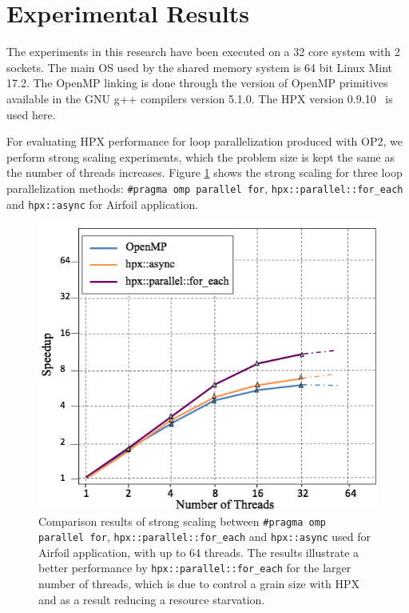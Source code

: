 \documentclass[conference]{IEEEtran}
\begin{document}
\section{Experimental Results}
\label{sec:res}


The experiments in this research have been executed on a 32 core system with 2 sockets. The main OS used by the shared memory system is 64 bit Linux Mint 17.2. The OpenMP linking is done through the version of OpenMP primitives available in the GNU g++ compilers version 5.1.0. The HPX version 0.9.10~\cite{hpx_v0.9.11} is used here.
 
 

For evaluating HPX performance for loop parallelization produced with OP2, we perform strong scaling experiments, which the problem size is kept the same as the number of threads increases. Figure \ref{f1} shows the strong scaling for three loop parallelization methods: \texttt{\#pragma omp parallel for}, \texttt{hpx::parallel::for\_each} and \texttt{hpx::async} for Airfoil application.

\begin{figure} [!h]
\begin{center}
\centering
\includegraphics[width=1\columnwidth]{Pictures/op2hpx1.jpg}
\caption {\small{Comparison results of strong scaling between \texttt{\#pragma omp parallel for}, \texttt{hpx::parallel::for\_each} and \texttt{hpx::async} used for Airfoil application,
with up to 64 threads. The results illustrate a better performance by \texttt{hpx::parallel::for\_each} for the larger number of threads, which is due to control a grain size with HPX and as a result reducing a resource starvation.}}
\label{f1}
\end{center}
\end{figure}
\end{document}
